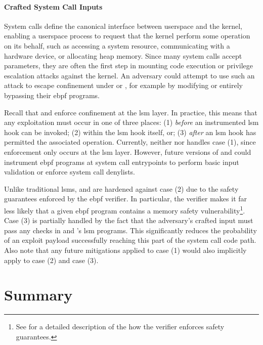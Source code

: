 \paragraph*{Crafted System Call Inputs}
System calls define the canonical interface between userspace and the kernel, enabling
a userspace process to request that the kernel perform some operation on its behalf, such
as accessing a system resource, communicating with a hardware device, or allocating heap
memory. Since many system calls accept parameters, they are often the first step in mounting
code execution or privilege escalation attacks against the kernel. An adversary could attempt
to use such an attack to escape confinement under \bpfbox{} or \bpfcontain{}, for example
by modifying or entirely bypassing their \gls{ebpf} programs.

Recall that \bpfbox{} and \bpfcontain{} enforce confinement at the \gls{lsm} layer.  In
practice, this means that any exploitation must occur in one of three places: (1)
\textit{before} an instrumented \gls{lsm} hook can be invoked; (2) within the \gls{lsm}
hook itself, or; (3) \textit{after} an \gls{lsm} hook has permitted the associated
operation. Currently, neither \bpfbox{} nor \bpfcontain{} handles case (1), since
enforcement only occurs at the \gls{lsm} layer. However, future versions of \bpfbox{} and
\bpfcontain{} could instrument \gls{ebpf} programs at system call entrypoints to perform
basic input validation or enforce system call denylists.

Unlike traditional \glspl{lsm}, \bpfbox{} and \bpfcontain{} are hardened against case (2)
due to the safety guarantees enforced by the \gls{ebpf} verifier. In particular, the
verifier makes it far less likely that a given \gls{ebpf} program contains a memory safety
vulnerability\footnote{See  for a detailed description of the how the
verifier enforces safety guarantees.}. Case (3) is partially handled by the fact that the
adversary's crafted input must pass any checks in \bpfbox{} and \bpfcontain{}'s \gls{lsm}
programs.  This significantly reduces the probability of an exploit payload successfully
reaching this part of the system call code path. Also note that any future mitigations
applied to case (1) would also implicitly apply to case (2) and case (3).

\section{Summary}%
\label{s:eval-summary}

